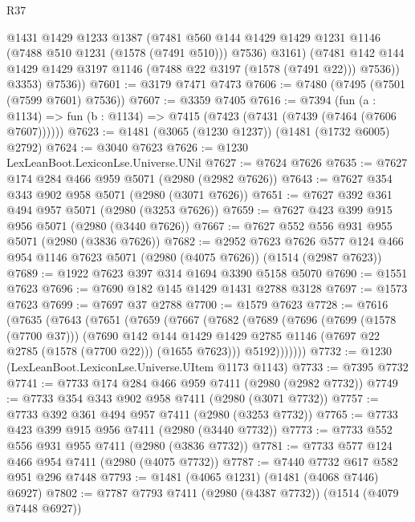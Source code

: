 \begin{lexlean}{R37}
\begin{coremodule}
              @1431
              @1429
              @1233
              @1387
              (@7481
                @560
                @144
                @1429
                @1429
                @1231
                @1146
                (@7488 @510 @1231 (@1578 (@7491 @510)))
                @7536)
              @3161)
            (@7481 @142 @144 @1429 @1429 @3197 @1146 (@7488 @22 @3197 (@1578 (@7491 @22))) @7536))
          @3353)
        @7536))
@7601 := @3179 @7471 @7473
@7606 := @7480 (@7495 (@7501 (@7599 @7601) @7536))
@7607 := @3359 @7405
@7616 := @7394
    (fun (a : @1134) => fun (b : @1134) => @7415 (@7423 (@7431 (@7439 (@7464 (@7606 @7607))))))
@7623 := @1481 (@3065 (@1230 @1237)) (@1481 (@1732 @6005) @2792)
@7624 := @3040 @7623
@7626 := @1230 LexLeanBoot.LexiconLse.Universe.UNil
@7627 := @7624 @7626
@7635 := @7627 @174 @284 @466 @959 @5071 (@2980 (@2982 @7626))
@7643 := @7627 @354 @343 @902 @958 @5071 (@2980 (@3071 @7626))
@7651 := @7627 @392 @361 @494 @957 @5071 (@2980 (@3253 @7626))
@7659 := @7627 @423 @399 @915 @956 @5071 (@2980 (@3440 @7626))
@7667 := @7627 @552 @556 @931 @955 @5071 (@2980 (@3836 @7626))
@7682 := @2952
    @7623
    @7626
    @577
    @124
    @466
    @954
    @1146
    @7623
    @5071
    (@2980 (@4075 @7626))
    (@1514 (@2987 @7623))
@7689 := @1922 @7623 @397 @314 @1694 @3390 @5158 @5070
@7690 := @1551 @7623
@7696 := @7690 @182 @145 @1429 @1431 @2788 @3128
@7697 := @1573 @7623
@7699 := @7697 @37 @2788
@7700 := @1579 @7623
@7728 := @7616
    (@7635
      (@7643
        (@7651
          (@7659
            (@7667
              (@7682
                (@7689
                  (@7696
                    (@7699 (@1578 (@7700 @37)))
                    (@7690
                      @142
                      @144
                      @1429
                      @1429
                      @2785
                      @1146
                      (@7697 @22 @2785 (@1578 (@7700 @22)))
                      (@1655 @7623)))
                  @5192)))))))
@7732 := @1230 (LexLeanBoot.LexiconLse.Universe.UItem @1173 @1143)
@7733 := @7395 @7732
@7741 := @7733 @174 @284 @466 @959 @7411 (@2980 (@2982 @7732))
@7749 := @7733 @354 @343 @902 @958 @7411 (@2980 (@3071 @7732))
@7757 := @7733 @392 @361 @494 @957 @7411 (@2980 (@3253 @7732))
@7765 := @7733 @423 @399 @915 @956 @7411 (@2980 (@3440 @7732))
@7773 := @7733 @552 @556 @931 @955 @7411 (@2980 (@3836 @7732))
@7781 := @7733 @577 @124 @466 @954 @7411 (@2980 (@4075 @7732))
@7787 := @7440 @7732 @617 @582 @951 @296 @7448
@7793 := @1481 (@4065 @1231) (@1481 (@4068 @7446) @6927)
@7802 := @7787 @7793 @7411 (@2980 (@4387 @7732)) (@1514 (@4079 @7448 @6927))

\end{coremodule}
\end{lexlean}
